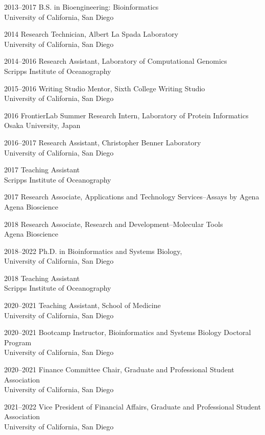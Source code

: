 \documentclass[11pt]{formatting-template}
\begin{document}
\begin{vita}
\noindent
\begin{cv}{}
\begin{cvlist}{}
	\item[2013--2017] B.S. in Bioengineering: Bioinformatics\\
		University of California, San Diego
	\item[2014] Research Technician, Albert La Spada Laboratory\\	
		University of California, San Diego
	\item[2014--2016] Research Assistant, Laboratory of Computational Genomics\\
		Scripps Institute of Oceanography 
	\item[2015--2016] Writing Studio Mentor, Sixth College Writing Studio\\
		University of California, San Diego
	\item[2016] FrontierLab Summer Research Intern, Laboratory of Protein Informatics\\
		Osaka University, Japan  
	\item[2016--2017] Research Assistant, Christopher Benner Laboratory\\
		University of California, San Diego
	\item[2017] Teaching Assistant\\Scripps Institute of Oceanography 
	\item[2017] Research Associate, Applications and Technology Services--Assays by Agena\\
		Agena Bioscience
	\item[2018] Research Associate, Research and Development--Molecular Tools\\
		Agena Bioscience 
	\item[2018--2022] Ph.D. in Bioinformatics and Systems Biology,\\
		University of California, San Diego
	\item[2018] Teaching Assistant\\
		Scripps Institute of Oceanography
	\item[2020--2021] Teaching Assistant, School of Medicine\\
		University of California, San Diego 
	\item[2020--2021] Bootcamp Instructor, Bioinformatics and Systems Biology Doctoral Program\\
		University of California, San Diego 
	\item[2020--2021] Finance Committee Chair, Graduate and Professional Student Association\\
		University of California, San Diego
	\item[2021--2022] Vice President of Financial Affairs, Graduate and Professional Student Association\\
		University of California, San Diego
\end{cvlist}
\end{cv}


\end{vita}
\end{document}
